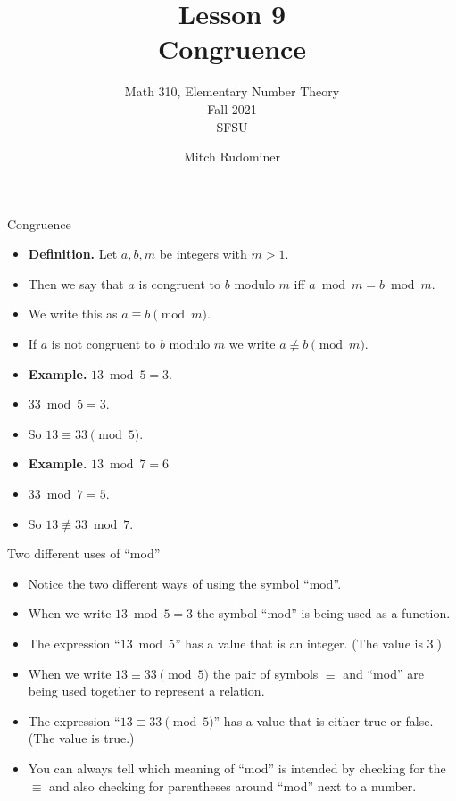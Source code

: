 \documentclass[handout]{beamer}
\title{Lesson 9 \\ Congruence}
\subtitle{Math 310, Elementary Number Theory \\ Fall 2021 \\ SFSU}
\author{Mitch Rudominer}
\date{}
\begin{document}
\begin{frame}
  \titlepage
\end{frame}

\begin{frame}{Congruence}

\begin{itemize}
  \item \textbf{Definition.} Let $a,b,m$ be integers with $m>1$.
  \item Then we say that $a$ is congruent to $b$ modulo $m$ iff $a\bmod m = b\bmod m$.
  \item We write this as $a\equiv b \pmod m$.
  \item If $a$ is not congruent to $b$ modulo $m$ we write $a\not\equiv b \pmod m$.
  \item \textbf{Example.} $13\bmod 5 = 3$.
  \item $33 \bmod 5 = 3$.
  \item So $13 \equiv 33 \pmod 5$.
  \item \textbf{Example.} $13 \bmod 7 = 6$
  \item $33 \bmod 7 = 5$.
  \item So $13 \not\equiv 33 \bmod 7$.
\end{itemize}

\end{frame}

\begin{frame}{Two different uses of ``mod''}

\begin{itemize}
  \item Notice the two different ways of using the symbol ``mod''.
  \item When we write $13\bmod 5 = 3$ the symbol ``mod'' is being used as a function.
  \item The expression ``$13\bmod 5$'' has a value that is an integer. (The value is 3.)
  \item When we write $13 \equiv 33 \pmod 5$ the pair of symbols $\equiv$ and ``mod'' are being
  used together to represent a relation.
  \item The expression ``$13 \equiv 33 \pmod 5$'' has a value that is either true or false. (The value is true.)
  \item You can always tell which meaning of ``mod'' is intended by checking for the $\equiv$ and
  also checking for parentheses around  ``mod'' next to a number.
\end{itemize}

\end{frame}
\end{document}
